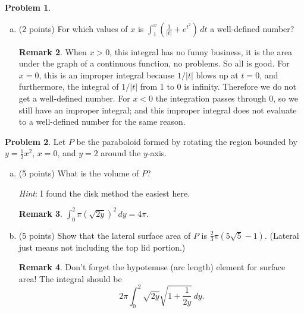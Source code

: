 \documentclass[11pt,oneside]{amsart}
\theoremstyle{definition}
\newtheorem{problem}{Problem}
\newtheorem*{remark}{Remark}
\begin{document}
\begin{problem}
\begin{enumerate}[(a)]
\begin{remark}
        \end{remark}
        \vfill
  \item (2 points) For which values of $x$ is $\displaystyle\int_1^x\left(\frac 1{|t|}+e^{t^2}\right)\,dt$ a well-defined number?
        \begin{remark}
          When $x>0$, this integral has no funny business, it is the area under the graph of a continuous function, no problems. So all is good. For $x=0$, this is an improper integral because $1/|t|$ blows up at $t=0$, and furthermore, the integral of $1/|t|$ from 1 to 0 is infinity. Therefore we do not get a well-defined number. For $x<0$ the integration passes through 0, so we still have an improper integral; and this improper integral does not evaluate to a well-defined number for the same reason.
        \end{remark}
        \vfill
\end{enumerate}
\end{problem}

\newpage

\begin{problem}
Let $P$ be the paraboloid formed by rotating the region bounded by $y=\frac 12x^2$, $x=0$, and $y=2$ around the $y$-axis.

\begin{enumerate}[(a)]
  \item (5 points) What is the volume of $P$?

        \emph{Hint}: I found the disk method the easiest here.
        \begin{remark}
          $\int_0^2\pi(\sqrt{2y})^2\,dy=4\pi$.
        \end{remark}
        \vfill
  \item (5 points) Show that the lateral surface area of $P$  is $\frac 23\pi(5\sqrt 5-1)$. (Lateral just means not including the top lid portion.)
        \begin{remark}
          Don't forget the hypotenuse (arc length) element for surface area! The integral should be
          \[2\pi\int_0^2\sqrt{2y}\sqrt{1+\frac 1{2y}}\,dy.\]
        \end{remark}
        \vfill
\end{enumerate}
\end{problem}

\newpage
\end{document}
